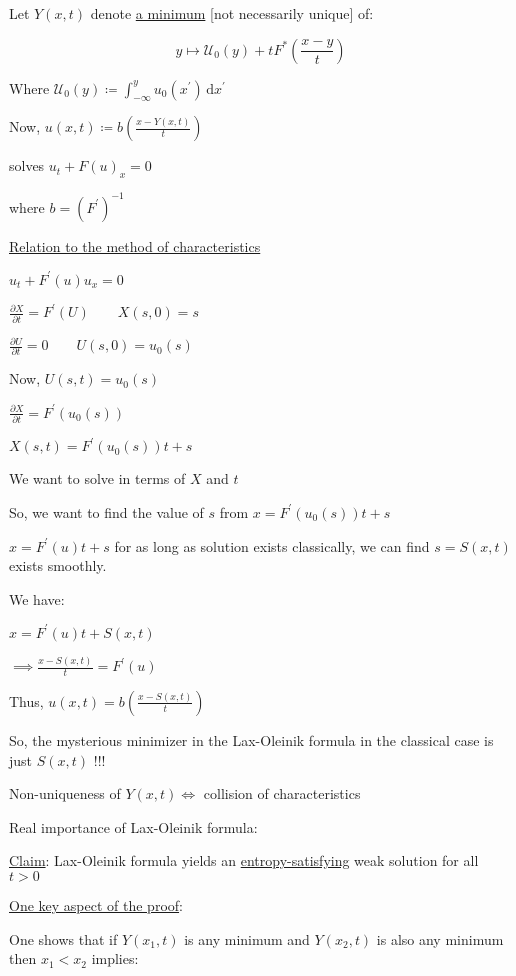 \documentclass{article}
\theoremstyle{definition}
\begin{document}
Let \(Y(x,t)\) denote \underline{a minimum} [not necessarily unique] of:

\[
    y \mapsto \mathcal{U}_0 (y) + t F^{\ast} \left( \frac{x-y}{t} \right) 
\]

Where \(\mathcal{U}_0(y) \coloneqq \int_{-\infty}^{y} u_0(x^{\prime} ) \,\mathrm{d}x^{\prime}  \)

Now, \(u(x,t) \coloneqq b \left( \frac{x-Y(x,t)}{t} \right) \) 

solves \(u_t + F(u)_x = 0\)

where \(b = (F^{\prime})^{-1} \) 

\underline{Relation to the method of characteristics} 

\(u_t + F^{\prime} (u) u_x = 0\)

\(\frac{\partial X}{\partial t} = F^{\prime}(U) \quad\quad X(s,0) = s\)

\(\frac{\partial U}{\partial t} = 0\quad\quad U(s,0)=u_0(s)\)

Now, \(U(s,t)=u_0(s)\) 

\(\frac{\partial X}{\partial t} = F^{\prime} (u_0(s))\)

\(X(s,t)=F^{\prime} (u_0(s))t + s\)

We want to solve in terms of \(X\) and \(t\)

So, we want to find the value of \(s\) from \(x = F^{\prime} (u_0(s))t + s\) 

\(x = F^{\prime} (u)t + s\) for as long as solution exists classically, we can find \(s = S(x,t)\) exists smoothly.

We have:

\(x = F^{\prime} (u) t + S(x,t)\)

\(\implies \frac{x-S(x,t)}{t} = F^{\prime} (u)\)

Thus, \(u(x,t) = b \left( \frac{x-S(x,t)}{t} \right) \) 

So, the mysterious minimizer in the Lax-Oleinik formula in the classical case is just \(S(x,t)\) !!!

Non-uniqueness of \(Y(x,t) \iff\) collision of characteristics

Real importance of Lax-Oleinik formula:

\underline{Claim}: Lax-Oleinik formula yields an \underline{entropy-satisfying} weak solution for all \(t > 0\) 

\underline{One key aspect of the proof}:

One shows that if \(Y(x_1,t)\) is any minimum and \(Y(x_2,t)\) is also any minimum then \(x_1 < x_2\) implies:
\end{document}

